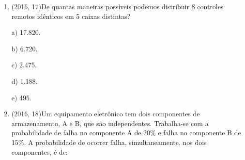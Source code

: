 \documentclass{article}
\begin{document}
\begin{enumerate}
c) 3.796.875.

d) 4.066.875.

e) 11.390.625.\newline
 

\textbf{RESOLUÇÃO}

$\rule[1cm]{100cm}{1px}$

para o promeiro caso(4) temos 

5.15.15.15 = 16875

para o segundo caso(5) temos 

5.15.15.15.15  = 253125

para o terceiro caso(6) temos 

5.15.15.15.15.15 = 3796875

16875 + 253125 + 3796875 = 4066875.\newline

d) 4.066.875.\newline



\textbf{CONTEÚDO}

$\rule[1cm]{100cm}{1px}$


como apenas a primeira posição era pré definida então fizemos o 5 referente as 5 vogais, logo após fomos resolvando cada caso onde no enunciado dizia que poderia ser de 4 a 6 dígitos e os dígitos poderiam se repetir tinhamos 10 algarismos + 5 vogais =15 para cada caractere restante 


\newpage





\item (2016, 17)De quantas maneiras possíveis podemos distribuir 8 controles remotos idênticos em
5 caixas distintas?\newline

a) 17.820.

b) 6.720.

c) 2.475.

d) 1.188.

e) 495.\newline





\item (2016, 18)Um equipamento eletrônico tem dois componentes de armazenamento, A e B, que
são independentes. Trabalha-se com a probabilidade de falha no componente A de 20\% e falha no
componente B de 15\%. A probabilidade de ocorrer falha, simultaneamente, nos dois componentes, é
de:


\end{enumerate}
\end{document}
